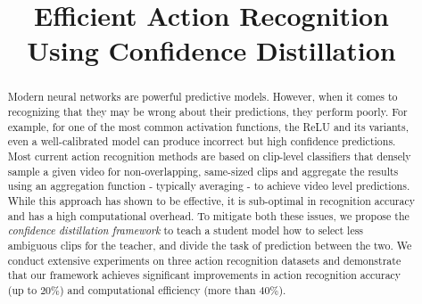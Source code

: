 \documentclass[a4paper,conference]{IEEEtran}
\begin{document}
\title{Efficient Action Recognition \\ Using Confidence Distillation}


\author{
\and
{}
\and
{}
}













\maketitle

\begin{abstract}
  Modern neural networks are powerful predictive models. However, when it comes to recognizing that they may be wrong about their predictions, they perform poorly. For example, for one of the most common activation functions, the ReLU and its variants, even a well-calibrated model can produce incorrect but high confidence predictions. Most current action recognition methods are based on clip-level classifiers that densely sample a given video for non-overlapping, same-sized clips and aggregate the results using an aggregation function - typically averaging - to achieve video level predictions. While this approach has shown to be effective, it is sub-optimal in recognition accuracy and has a high computational overhead. To mitigate both these issues, we propose the \textit{confidence distillation framework} to teach a student model how to select less ambiguous clips for the teacher, and divide the task of prediction between the two. We conduct extensive experiments on three action recognition datasets and demonstrate that our framework achieves significant improvements in action recognition accuracy (up to $20\%$) and computational efficiency (more than $40\%$).
\end{abstract}
\end{document}
